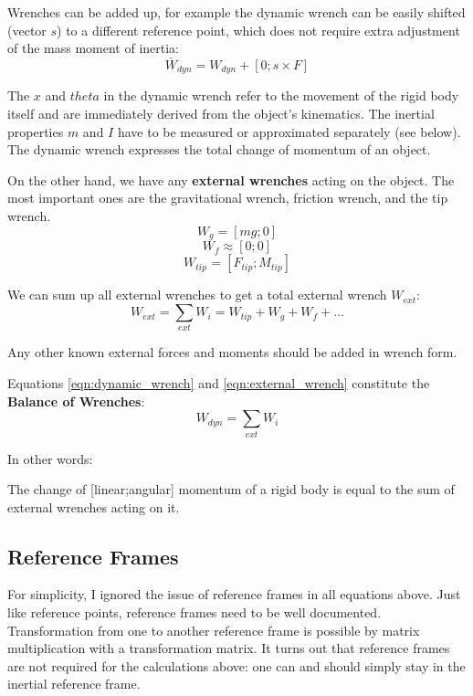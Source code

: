 \documentclass[10pt,a4paper]{article}
\begin{document}
Wrenches can be added up, for example the dynamic wrench can be easily shifted (vector \(s\)) to a different reference point, which does not require extra adjustment of the mass moment of inertia:
\begin{equation}\label{eqn:shift_wrench}
\bar W_{dyn} = W_{dyn} + \left[ 0; s \times F \right]
\end{equation}


The \(x\) and \(theta\) in the dynamic wrench refer to the movement of the rigid body itself and are immediately derived from the object's kinematics.
The inertial properties \(m\) and \(I\) have to be measured or approximated separately (see below).
The dynamic wrench expresses the total change of momentum of an object.


On the other hand, we have any \textbf{external wrenches} acting on the object.
The most important ones are the gravitational wrench, friction wrench, and the tip wrench.
\[W_{g} = \left[ mg; 0 \right]\]
\[W_{f} \approx \left[ 0; 0 \right]\]
\[W_{tip}_{} = \left[ F_{tip}; M_{tip} \right]\]

We can sum up all external wrenches to get a total external wrench \(W_{ext}\):
\begin{equation}\label{eqn:external_wrench}
W_{ext} = \sum\limits_{ext} W_{i} = W_{tip}+W_{g}+W_{f}+\ldots
\end{equation}

Any other known external forces and moments should be added in wrench form.


Equations \eqref{eqn:dynamic_wrench} and \eqref{eqn:external_wrench} constitute the \textbf{Balance of Wrenches}:
\begin{equation}\label{eqn:balance_of_wrenches}
W_{dyn} = \sum\limits_{ext} W_{i}
\end{equation}

In other words:
\begin{center}
The change of [linear;angular] momentum of a rigid body is equal to the sum of external wrenches acting on it.
\end{center}


\subsection{Reference Frames}
\label{sec:org158fc9a}

For simplicity, I ignored the issue of reference frames in all equations above.
Just like reference points, reference frames need to be well documented.
Transformation from one to another reference frame is possible by matrix multiplication with a transformation matrix.
It turns out that reference frames are not required for the calculations above: one can and should simply stay in the inertial reference frame.
\end{document}
